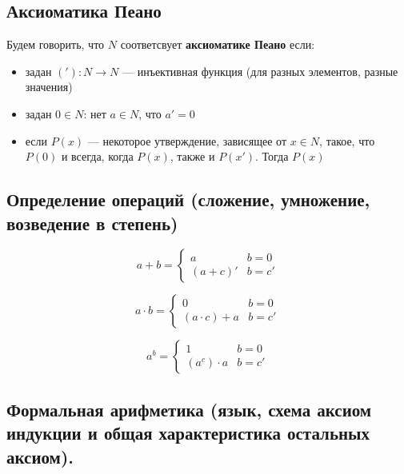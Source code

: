 \documentclass[english]{article}
\begin{document}
\subsection{Аксиоматика Пеано}
\label{sec:org5a30a16}
\begin{definition}
	Будем говорить, что \(N\) соответсвует \textbf{аксиоматике Пеано} если:
	\begin{itemize}
		\item задан \(('): N \to N\) --- инъективная функция (для разных элементов, разные значения)
		\item задан \(0 \in N\): нет \(a \in N\), что \(a' = 0\)
		\item если \(P(x)\) --- некоторое утверждение, зависящее от \(x \in N\), такое, что \(P(0)\) и всегда, когда \(P(x)\), также и \(P(x')\). Тогда \(P(x)\)
	\end{itemize}
	\label{org744ec42}
\end{definition}
\subsection{Определение операций (сложение, умножение, возведение в степень)}
\label{sec:org8283f57}
\begin{definition}
	\[ a + b = \begin{cases}
			a        & b = 0  \\
			(a + c)' & b = c'
		\end{cases}\]
	\label{orge628873}
\end{definition}
\begin{definition}
	\[ a \cdot b = \begin{cases}
			0               & b = 0  \\
			(a \cdot c) + a & b = c'
		\end{cases}\]
	\label{org93b9bc7}
\end{definition}
\begin{definition}
	\[ a^b = \begin{cases}
			1            & b = 0  \\
			(a^c)\cdot a & b = c'
		\end{cases}\]
	\label{orgff7a1f1}
\end{definition}
\subsection{Формальная арифметика (язык, схема аксиом индукции и общая характеристика остальных аксиом).}
\label{sec:org6fbcf7d}
\end{document}
